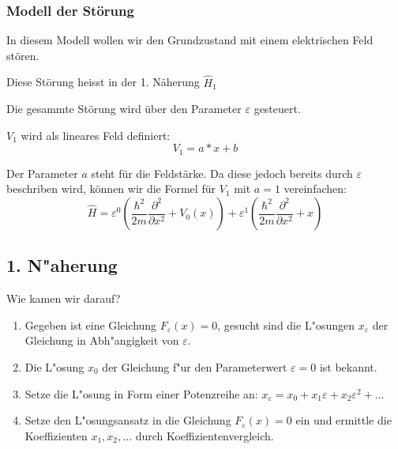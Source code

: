 \begin{refsection}
\subsubsection{ Modell der St\"orung }
In diesem Modell wollen wir den Grundzustand mit einem elektrischen Feld st\"oren.

Diese St\"orung heisst in der 1. N\"aherung $\hat H_1$

Die gesammte St\"orung wird \"uber den Parameter $\varepsilon$ gesteuert.

$V_1$ wird als lineares Feld definiert:
\[
  V_1 = a*x + b
\]

Der Parameter $a$ steht f\"ur die Feldst\"arke. Da diese jedoch bereits durch 
$\varepsilon$ beschriben wird, k\"onnen wir die Formel f\"ur $V_1$ mit $a = 1$ vereinfachen:
\[
  \hat{H} = \varepsilon^0 ( \frac{\hbar^2}{2m} \frac{\partial^2}{\partial x^2} + V_0(x) )
            + \varepsilon^1 ( \frac{\hbar^2}{2m} \frac{\partial^2}{\partial x^2} + x )
\]


\subsection{ 1. N"aherung }

Wie kamen wir darauf?

\begin{enumerate}
\item Gegeben ist eine Gleichung $F_\varepsilon(x)=0$, gesucht
sind die L"osungen $x_\varepsilon$ der Gleichung in Abh"angigkeit von
$\varepsilon$.
\item Die L"osung $x_0$ der Gleichung f"ur den Parameterwert $\varepsilon=0$
ist bekannt.
\item Setze die L"osung in Form einer Potenzreihe an:
$x_\varepsilon = x_0+x_1\varepsilon+x_2\varepsilon^2+\dots$
\item Setze den L"osungsansatz in die Gleichung $F_\varepsilon(x)=0$ ein
und ermittle die Koeffizienten $x_1,x_2,\dots$ durch Koeffizientenvergleich.
\end{enumerate}


\end{refsection}
